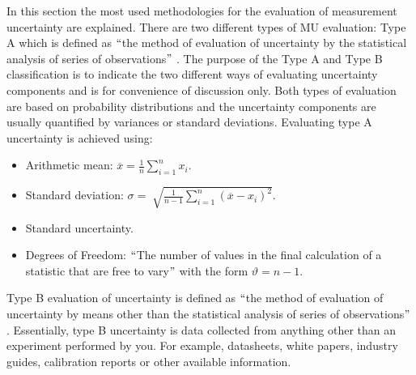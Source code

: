 In this section the most used methodologies for the evaluation of measurement uncertainty are explained. There are two different types of \acs{MU} evaluation: Type A which is defined as $``$the method of evaluation of uncertainty by the statistical analysis of series of observations$"$ \cite{jcgm}.
The purpose of the Type A and Type B classification is to indicate the two different ways of evaluating uncertainty components and is for convenience of discussion only. Both types of evaluation are based on probability distributions and the uncertainty components are usually quantified by variances or standard deviations.
Evaluating type A uncertainty is achieved using:
\begin{itemize}
	\item Arithmetic mean:  $\overline{x}=\frac{1}{n} \sum _{i=1}^{n}x_{i}$.

	\item Standard deviation: $\sigma = \sqrt[]{\frac{1}{n-1} \sum _{i=1}^{n} \left( \overline{x}-x_{i} \right) ^{2}}$.

	\item Standard uncertainty.

	\item Degrees of Freedom: $``$The number of values in the final calculation of a statistic that are free to vary$"$  with the form  $\vartheta =n-1$.
\end{itemize}
Type B evaluation of uncertainty is defined as $``$the method of evaluation of uncertainty by means other than the statistical analysis of series of observations$"$ \cite{jcgm}. Essentially, type B uncertainty is data collected from anything other than an experiment performed by you. For example, datasheets, white papers, industry guides, calibration reports or other available information.